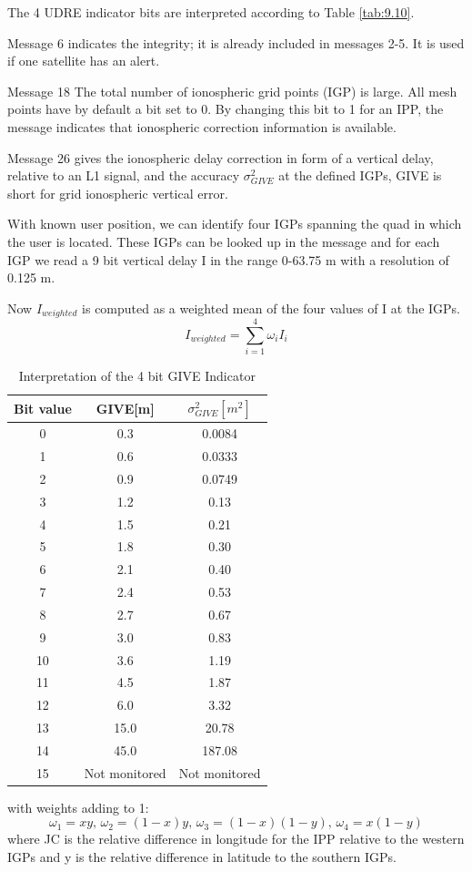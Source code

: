 		The 4 UDRE indicator bits are interpreted according to Table \ref{tab:9.10}.
		
		Message 6 indicates the integrity; it is already included in messages 2-5. It is used if one satellite has an alert.
		
		Message 18 The total number of ionospheric grid points (IGP) is large. All mesh points have by default a bit set to 0. By changing this bit to 1 for an IPP, the message indicates that ionospheric correction information is available.
		
		Message 26 gives the ionospheric delay correction in form of a vertical delay, relative to an L1 signal, and the accuracy $\sigma^2_{GIVE}$ at the defined IGPs, GIVE is short for grid ionospheric vertical error.
		
		With known user position, we can identify four IGPs spanning the quad in which the user is located. These IGPs can be looked up in the message and for each IGP we read a 9 bit vertical delay I in the range 0-63.75 m with a resolution of 0.125 m.
		
		Now $I_{weighted}$ is computed as a weighted mean of the four values of I at the IGPs.
		\begin{equation}\label{eq:9.52}
			I_{weighted}=\sum^4_{i=1}\omega_iI_i
		\end{equation}
		\begin{table}[h]
			\centering
			\caption{Interpretation of the 4 bit GIVE Indicator}
			\label{tab:9.11}
			\begin{tabular}{ccc}
				\hline 
				Bit value & GIVE[m] & $\sigma^2_{GIVE}[m^2]$ \\
				\hline
				0 & 0.3 & 0.0084\\
				1 & 0.6 & 0.0333\\
				2 & 0.9 & 0.0749\\
				3 & 1.2 & 0.13\\
				4 & 1.5 & 0.21\\
				5 & 1.8 & 0.30\\
				6 & 2.1 & 0.40\\
				7 & 2.4 & 0.53\\
				8 & 2.7 & 0.67\\
				9 & 3.0 & 0.83\\
				10 & 3.6 & 1.19\\
				11 & 4.5 & 1.87\\
				12 & 6.0 & 3.32\\
				13 & 15.0 & 20.78\\
				14 & 45.0 & 187.08\\
				15 &Not monitored & Not monitored \\
				\hline
			\end{tabular} 
		\end{table}
		with weights adding to 1:
		\begin{equation*}
			\omega_1 =xy,\,\omega_2=(1-x)y,\,\omega_3=(1-x)(1-y),\,\omega_4=x(1-y)
		\end{equation*}
		where JC is the relative difference in longitude for the IPP relative to the western IGPs and y is the relative difference in latitude to the southern IGPs.
		
